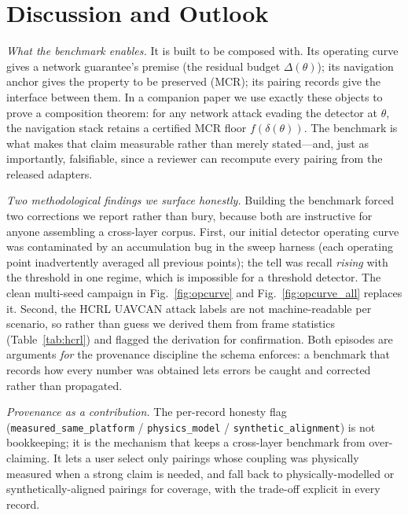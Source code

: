 \documentclass[conference]{IEEEtran}
\newcommand{\dataset}[1]{\textsc{#1}}
\newcommand{\code}[1]{\texttt{#1}}
\begin{document}
\section{Discussion and Outlook}
\label{sec:discussion}
\emph{What the benchmark enables.} It is built to be composed with. Its operating
curve gives a network guarantee's premise (the residual budget $\Delta(\theta)$);
its navigation anchor gives the property to be preserved (MCR); its pairing
records give the interface between them. In a companion paper we use exactly
these objects to prove a composition theorem: for any network attack evading the
detector at $\theta$, the navigation stack retains a certified MCR floor
$f(\delta(\theta))$. The benchmark is what makes that claim measurable rather
than merely stated---and, just as importantly, falsifiable, since a reviewer can
recompute every pairing from the released adapters.

\emph{Two methodological findings we surface honestly.} Building the benchmark
forced two corrections we report rather than bury, because both are instructive
for anyone assembling a cross-layer corpus. First, our initial detector
operating curve was contaminated by an accumulation bug in the sweep harness
(each operating point inadvertently averaged all previous points); the tell was
recall \emph{rising} with the threshold in one regime, which is impossible for a
threshold detector. The clean multi-seed campaign in Fig.~\ref{fig:opcurve} and
Fig.~\ref{fig:opcurve_all} replaces it. Second, the \dataset{HCRL UAVCAN} attack
labels are not machine-readable per scenario, so rather than guess we derived
them from frame statistics (Table~\ref{tab:hcrl}) and flagged the derivation for
confirmation. Both episodes are arguments \emph{for} the provenance discipline
the schema enforces: a benchmark that records how every number was obtained lets
errors be caught and corrected rather than propagated.

\emph{Provenance as a contribution.} The per-record honesty flag
(\code{measured\_same\_platform} / \code{physics\_model} /
\code{synthetic\_alignment}) is not bookkeeping; it is the mechanism that keeps a
cross-layer benchmark from over-claiming. It lets a user select only pairings
whose coupling was physically measured when a strong claim is needed, and fall
back to physically-modelled or synthetically-aligned pairings for coverage,
with the trade-off explicit in every record.
\end{document}
